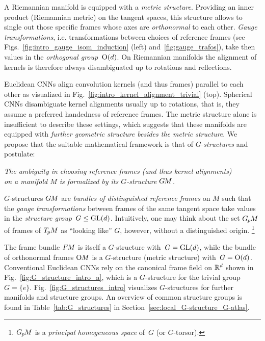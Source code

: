 A Riemannian manifold is equipped with a \emph{metric structure}.
Providing an inner product (Riemannian metric) on the tangent spaces, this structure allows to single out those specific frames whose axes are \emph{orthonormal} to each other.
\emph{Gauge transformations}, i.e. transformations between choices of reference frames (see Figs.~\ref{fig:intro_gauge_isom_induction} (left) and~\ref{fig:gauge_trafos}), take then values in the \emph{orthogonal group}~$\operatorname{O}(d)$.
On Riemannian manifolds the alignment of kernels is therefore always disambiguated up to rotations and reflections.


Euclidean CNNs align convolution kernels (and thus frames)
parallel to each other as visualized in Fig.~\ref{fig:intro_kernel_alignment_trivial} (top).
Spherical CNNs disambiguate kernel alignments usually up to rotations, that is, they assume a preferred handedness of reference frames.
The metric structure alone is insufficient to describe these settings, which suggests that these manifolds are equipped with \emph{further geometric structure besides the metric structure}.
We propose that the suitable mathematical framework is that of $G$-\emph{structures} and postulate:

\begin{minipage}{\textwidth}
\begin{center}\it
    The ambiguity in choosing reference frames (and thus kernel alignments) \\
    on a manifold $M$ is formalized by its $G$-structure $G\mkern-1.4muM$.
\end{center}
\end{minipage}

$G$-structures $G\mkern-1.4muM$ are \emph{bundles of distinguished reference frames} on $M$ such that the \emph{gauge transformations} between frames of the same tangent space take values in the \emph{structure group}~${G\leq\operatorname{GL}(d)}$.
Intuitively, one may think about the set $G_{\mkern-1.3mu p}\mkern-1.2muM$ of frames of $T_{\mkern-1.5mu p}\mkern-.5muM$ as ``looking like'' $G$, however, without a distinguished origin.%
\footnote{
    $G_{\mkern-1.3mu p}\mkern-1.2muM$ is a \emph{principal homogeneous space} of~$G$ (or $G$-torsor).
}


The frame bundle $F\mkern-1.5muM$ is itself a $G$-structure with~${G=\operatorname{GL}(d)}$, while the bundle of orthonormal frames $\operatorname{O}\mkern-3.6muM$ is a $G$-structure (metric structure) with~${G=\operatorname{O}(d)}$.
Conventional Euclidean CNNs rely on the canonical frame field on $\mathbb{R}^d$ shown in Fig.~\ref{fig:G_structure_intro_a}, which is a $G$-structure for the trivial group~${G=\{e\}}$.
Fig.~\ref{fig:G_structures_intro} visualizes $G$-structures for further manifolds and structure groups.
An overview of common structure groups is found in Table~\ref{tab:G_structures} in Section~\ref{sec:local_G-structure_G-atlas}.



